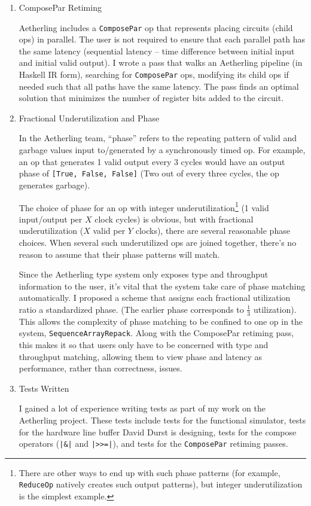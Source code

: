 \documentclass[12pt]{article}
\begin{document}
\begin{enumerate}
\item ComposePar Retiming

Aetherling includes a \texttt{ComposePar} op that represents placing
circuits (child ops) in parallel. The user is not required to ensure
that each parallel path has the same latency (sequential latency --
time difference between initial input and initial valid output). I wrote a
pass that walks an Aetherling pipeline (in Haskell IR form), searching
for \texttt{ComposePar} ops, modifying its child ops if needed such
that all paths have the same latency. The pass finds an optimal
solution that minimizes the number of register bits added to the
circuit.

\item Fractional Underutilization and Phase

In the Aetherling team, ``phase'' refers to the repeating pattern of
valid and garbage values input to/generated by a synchronously timed
op. For example, an op that generates 1 valid output every 3 cycles
would have an output phase of \texttt{[True, False, False]} (Two out
of every three cycles, the op generates garbage).

The choice of phase for an op with integer underutilization\footnote{
  There are other ways to end up with such phase patterns (for example,
  \texttt{ReduceOp} natively creates such output patterns), but integer
  underutilization is the simplest example.
} (1 valid
input/output per $X$ clock cycles) is obvious, but with fractional
underutilization ($X$ valid per $Y$ clocks), there are several
reasonable phase choices. When several such underutilized ops are
joined together, there's no reason to assume that their phase patterns
will match.

Since the Aetherling type system only exposes type and throughput
information to the user, it's vital that the system take care of phase
matching automatically. I proposed a scheme that assigns each
fractional utilization ratio a standardized phase. (The earlier phase
corresponds to $\frac{1}{3}$ utilization). This allows the complexity
of phase matching to be confined to one op in the system,
\texttt{SequenceArrayRepack}. Along with the ComposePar retiming pass,
this makes it so that users only have to be concerned with type and
throughput matching, allowing them to view phase and latency as
performance, rather than correctness, issues.

\item Tests Written

I gained a lot of experience writing tests as part of my work on the
Aetherling project. These tests include tests for the functional
simulator, tests for the hardware line buffer David Durst is
designing, tests for the compose operators (\texttt{|\&|} and
\texttt{|>>=|}), and tests for the \texttt{ComposePar} retiming passes.

\end{enumerate}
\end{document}

